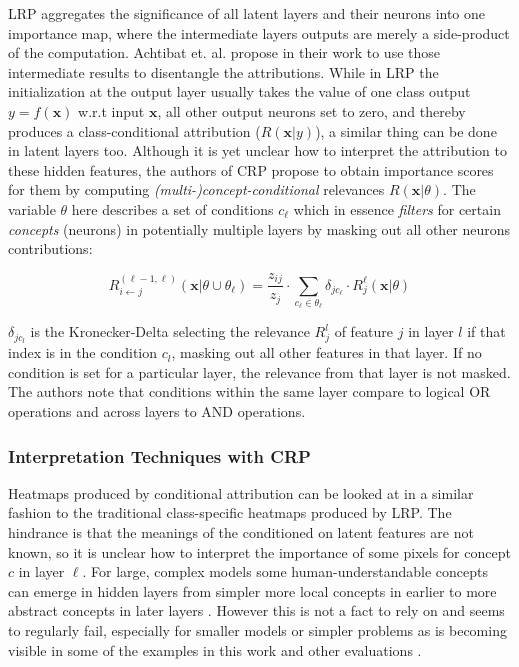 LRP aggregates the significance of all latent layers and their neurons into one importance map, where the intermediate layers outputs are merely a side-product of the computation.
Achtibat et. al. propose in their work \cite{Achtibat2022} to use those intermediate results to disentangle the attributions. While in LRP the initialization at the output layer usually takes the value of one class output $y= f(\mathbf{x})$ w.r.t input $\mathbf{x}$, all other output neurons set to zero, and thereby produces a class-conditional attribution ($R(\mathbf{x}|y)$), a similar thing can be done in latent layers too. Although it is yet unclear how to interpret the attribution to these hidden features, the authors of CRP propose to obtain importance scores for them by computing \textit{(multi-)concept-conditional} relevances $R(\mathbf{x}|\theta)$. The variable $\theta$ here describes a set of conditions $c_{\ell}$ which in essence \textit{filters} for certain \textit{concepts} (neurons) in potentially multiple layers by masking out all other neurons contributions:

\begin{equation}\displaystyle
    R^{(\ell-1, \ell)}_{i \leftarrow j} (\mathbf{x} | \theta \cup \theta_{\ell}) = \frac{z_{ij}}{z_j} \cdot \sum_{c_{\ell} \in \theta_{\ell}} \delta_{jc_{\ell}} \cdot R^{\ell}_j (\mathbf{x} | \theta )
\end{equation}

$\delta_{jc_l}$ is the Kronecker-Delta selecting the relevance $R^l_j$ of feature $j$ in layer $l$ if that index is in the condition $c_l$, masking out all other features in that layer. If no condition is set for a particular layer, the relevance from that layer is not masked. The authors note that conditions within the same layer compare to logical OR operations and across layers to AND operations. 

\subsubsection{Interpretation Techniques with CRP}
Heatmaps produced by conditional attribution can be looked at in a similar fashion to the traditional class-specific heatmaps produced by LRP. The hindrance is that the meanings of the conditioned on latent features are not known, so it is unclear how to interpret the importance of some pixels for concept $c$ in layer $\ell$. For large, complex models some human-understandable concepts can emerge in hidden layers from simpler more local concepts in earlier to more abstract concepts in later layers \cite{Bau2017, Hohman2020, Olah2017, Bau2020}. However this is not a fact to rely on and seems to regularly fail, especially for smaller models or simpler problems as is becoming visible in some of the examples in this work and other evaluations \cite{Kim2018,Singla2022, Sixt2022a}.

